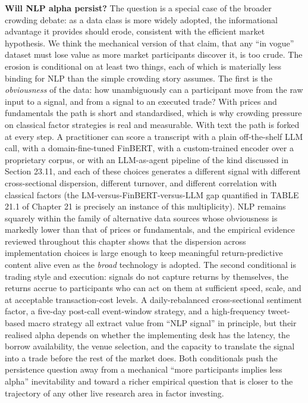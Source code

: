 \textbf{Will NLP alpha persist?} The question is a special case of the broader crowding debate: as a data class is more widely adopted, the informational advantage it provides should erode, consistent with the efficient market hypothesis. We think the mechanical version of that claim, that any ``in vogue'' dataset must lose value as more market participants discover it, is too crude. The erosion is conditional on at least two things, each of which is materially less binding for NLP than the simple crowding story assumes. The first is the \textit{obviousness} of the data: how unambiguously can a participant move from the raw input to a signal, and from a signal to an executed trade? With prices and fundamentals the path is short and standardised, which is why crowding pressure on classical factor strategies is real and measurable. With text the path is forked at every step. A practitioner can score a transcript with a plain off-the-shelf LLM call, with a domain-fine-tuned FinBERT, with a custom-trained encoder over a proprietary corpus, or with an LLM-as-agent pipeline of the kind discussed in Section 23.11, and each of these choices generates a different signal with different cross-sectional dispersion, different turnover, and different correlation with classical factors (the LM-versus-FinBERT-versus-LLM gap quantified in TABLE 21.1 of Chapter 21 is precisely an instance of this multiplicity). NLP remains squarely within the family of alternative data sources whose obviousness is markedly lower than that of prices or fundamentals, and the empirical evidence reviewed throughout this chapter shows that the dispersion across implementation choices is large enough to keep meaningful return-predictive content alive even as the \textit{broad} technology is adopted. The second conditional is trading style and execution: signals do not capture returns by themselves, the returns accrue to participants who can act on them at sufficient speed, scale, and at acceptable transaction-cost levels. A daily-rebalanced cross-sectional sentiment factor, a five-day post-call event-window strategy, and a high-frequency tweet-based macro strategy all extract value from ``NLP signal'' in principle, but their realised alpha depends on whether the implementing desk has the latency, the borrow availability, the venue selection, and the capacity to translate the signal into a trade before the rest of the market does. Both conditionals push the persistence question away from a mechanical ``more participants implies less alpha'' inevitability and toward a richer empirical question that is closer to the trajectory of any other live research area in factor investing.

